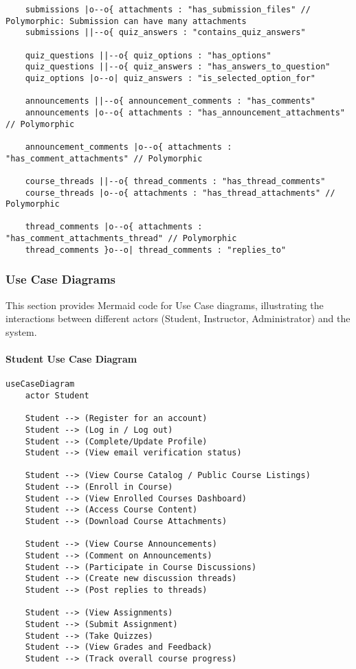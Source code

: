 \begin{verbatim}
    submissions |o--o{ attachments : "has_submission_files" // Polymorphic: Submission can have many attachments
    submissions ||--o{ quiz_answers : "contains_quiz_answers"

    quiz_questions ||--o{ quiz_options : "has_options"
    quiz_questions ||--o{ quiz_answers : "has_answers_to_question"
    quiz_options |o--o| quiz_answers : "is_selected_option_for"

    announcements ||--o{ announcement_comments : "has_comments"
    announcements |o--o{ attachments : "has_announcement_attachments" // Polymorphic

    announcement_comments |o--o{ attachments : "has_comment_attachments" // Polymorphic

    course_threads ||--o{ thread_comments : "has_thread_comments"
    course_threads |o--o{ attachments : "has_thread_attachments" // Polymorphic

    thread_comments |o--o{ attachments : "has_comment_attachments_thread" // Polymorphic
    thread_comments }o--o| thread_comments : "replies_to"

\end{verbatim}

\subsubsection*{Use Case Diagrams}

This section provides Mermaid code for Use Case diagrams, illustrating the interactions between different actors (Student, Instructor, Administrator) and the system.

\paragraph*{Student Use Case Diagram}
\begin{verbatim}
useCaseDiagram
    actor Student

    Student --> (Register for an account)
    Student --> (Log in / Log out)
    Student --> (Complete/Update Profile)
    Student --> (View email verification status)

    Student --> (View Course Catalog / Public Course Listings)
    Student --> (Enroll in Course)
    Student --> (View Enrolled Courses Dashboard)
    Student --> (Access Course Content)
    Student --> (Download Course Attachments)

    Student --> (View Course Announcements)
    Student --> (Comment on Announcements)
    Student --> (Participate in Course Discussions)
    Student --> (Create new discussion threads)
    Student --> (Post replies to threads)

    Student --> (View Assignments)
    Student --> (Submit Assignment)
    Student --> (Take Quizzes)
    Student --> (View Grades and Feedback)
    Student --> (Track overall course progress)
\end{verbatim}

